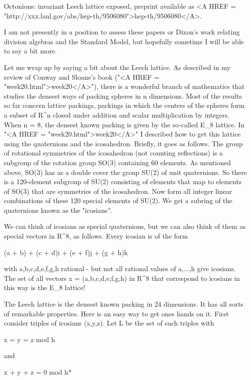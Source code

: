 Octonions: invariant Leech lattice exposed, preprint available as 
<A HREF = "http://xxx.lanl.gov/abs/hep-th/9506080">hep-th/9506080</A>.


I am not presently in a position to assess these papers or Dixon's work
relating division algebras and the Standard Model, but hopefully sometime
I will be able to say a bit more.

Let me wrap up by saying a bit about the Leech lattice.  As described
in my review of Conway and Sloane's book ("<A HREF =
"week20.html">week20</A>"), there is a wonderful branch of mathematics
that studies the densest ways of packing spheres in n dimensions.
Most of the results so far concern lattice packings, packings in which
the centers of the spheres form a subset of R^{n} closed under addition
and scalar multiplication by integers.  When n = 8, the densest known
packing is given by the so-called E_{8} lattice.  In "<A HREF
= "week20.html">week20</A>" I described how to get this lattice using
the quaternions and the icosahedron.  Briefly, it goes as follows.
The group of rotational symmetries of the icosahedron (not counting
reflections) is a subgroup of the rotation group SO(3) containing 60
elements.  As mentioned above, SO(3) has as a double cover the group
SU(2) of unit quaternions.  So there is a 120-element subgroup of
SU(2) consisting of elements that map to elements of SO(3) that are
symmetries of the icosahedron.  Now form all integer linear
combinations of these 120 special elements of SU(2).  We get a subring
of the quaternions known as the "icosians''.

We can think of icosians as special quaternions, but we can also think of
them as special vectors in R^{8}, as follows.  Every icosian is of the form

(a +  b) + (c +  d)i + (e +  f)j + (g +  h)k

with a,b,c,d,e,f,g,h rational - but not all rational values of
a,...,h give icosians.  The set of all vectors x = (a,b,c,d,e,f,g,h)
in R^{8} that correspond to icosians in this way is the
E_{8} lattice!

The Leech lattice is the densest known packing in 24 dimensions.  It has
all sorts of remarkable properties.  Here is an easy way to get ones hands
on it.  First consider triples of icosians (x,y,z).  Let L be the set of such 
triples with

x = y = z mod h

and 

x + y + z = 0 mod h*

